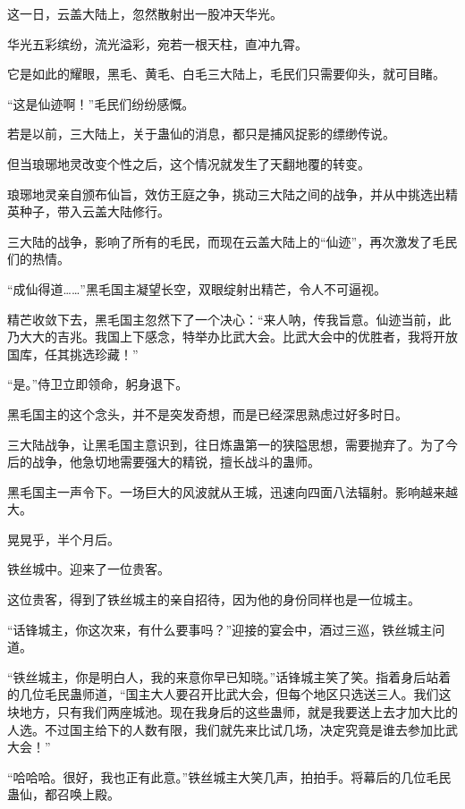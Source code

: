 
\begin{this_body}

这一日，云盖大陆上，忽然散射出一股冲天华光。

华光五彩缤纷，流光溢彩，宛若一根天柱，直冲九霄。

它是如此的耀眼，黑毛、黄毛、白毛三大陆上，毛民们只需要仰头，就可目睹。

“这是仙迹啊！”毛民们纷纷感慨。

若是以前，三大陆上，关于蛊仙的消息，都只是捕风捉影的缥缈传说。

但当琅琊地灵改变个性之后，这个情况就发生了天翻地覆的转变。

琅琊地灵亲自颁布仙旨，效仿王庭之争，挑动三大陆之间的战争，并从中挑选出精英种子，带入云盖大陆修行。

三大陆的战争，影响了所有的毛民，而现在云盖大陆上的“仙迹”，再次激发了毛民们的热情。

“成仙得道……”黑毛国主凝望长空，双眼绽射出精芒，令人不可逼视。

精芒收敛下去，黑毛国主忽然下了一个决心：“来人呐，传我旨意。仙迹当前，此乃大大的吉兆。我国上下感念，特举办比武大会。比武大会中的优胜者，我将开放国库，任其挑选珍藏！”

“是。”侍卫立即领命，躬身退下。

黑毛国主的这个念头，并不是突发奇想，而是已经深思熟虑过好多时日。

三大陆战争，让黑毛国主意识到，往日炼蛊第一的狭隘思想，需要抛弃了。为了今后的战争，他急切地需要强大的精锐，擅长战斗的蛊师。

黑毛国主一声令下。一场巨大的风波就从王城，迅速向四面八法辐射。影响越来越大。

晃晃乎，半个月后。

铁丝城中。迎来了一位贵客。

这位贵客，得到了铁丝城主的亲自招待，因为他的身份同样也是一位城主。

“话锋城主，你这次来，有什么要事吗？”迎接的宴会中，酒过三巡，铁丝城主问道。

“铁丝城主，你是明白人，我的来意你早已知晓。”话锋城主笑了笑。指着身后站着的几位毛民蛊师道，“国主大人要召开比武大会，但每个地区只选送三人。我们这块地方，只有我们两座城池。现在我身后的这些蛊师，就是我要送上去才加大比的人选。不过国主给下的人数有限，我们就先来比试几场，决定究竟是谁去参加比武大会！”

“哈哈哈。很好，我也正有此意。”铁丝城主大笑几声，拍拍手。将幕后的几位毛民蛊仙，都召唤上殿。


\end{this_body}
